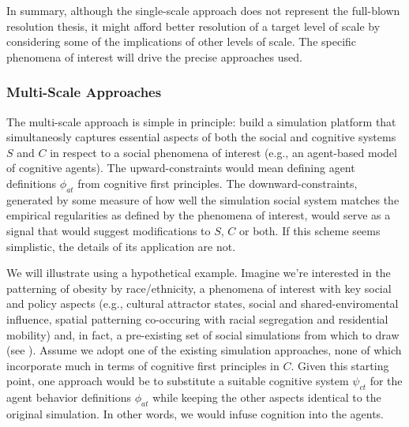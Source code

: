 \documentclass{article}
\begin{document}
In summary, although the single-scale approach does not represent the full-blown resolution thesis, it might afford better resolution of a target level of scale by considering some of the implications of other levels of scale. The specific phenomena of interest will drive the precise approaches used.

 \subsubsection{Multi-Scale Approaches}
The multi-scale approach is simple in principle: build a simulation platform that simultaneosly captures essential aspects of both the social and cognitive systems $S$ and $C$ in respect to a social phenomena of interest (e.g., an agent-based model of cognitive agents).  The upward-constraints would mean defining agent definitions $\phi_{at}$ from cognitive first principles. The downward-constraints, generated by some measure of how well the simulation social system matches the empirical regularities as defined by the phenomena of interest, would serve as a signal that would suggest modifications to $S$, $C$ or both.  If this scheme seems simplistic, the details of its application are not. 


We will illustrate using a hypothetical example. Imagine we're interested in the patterning of obesity by race/ethnicity, a phenomena of interest with key social and policy aspects (e.g., cultural attractor states, social and shared-enviromental influence, spatial patterning co-occuring with racial segregation and residential mobility) and, in fact, a pre-existing set of social simulations from which to draw (see \cite{nianogo2015agent}).  Assume we adopt one of the existing simulation approaches, none of which incorporate much in terms of cognitive first principles in $C$.  Given this starting point, one approach would be to substitute a suitable cognitive system $\psi_{ct}$ for the agent behavior definitions $\phi_{at}$  while keeping the other aspects identical to the original simulation. In other words, we would infuse cognition into the agents.  
\end{document}
